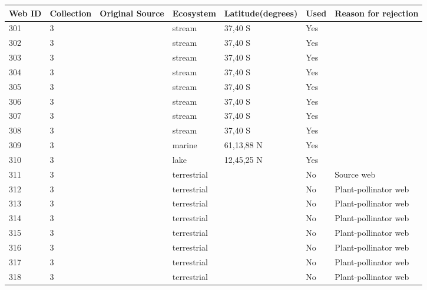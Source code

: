 \documentclass[12pt]{article}
\begin{document}
\begin{landscape}
    \begin{table}[h!]
    \centering
    {\footnotesize
      \begin{tabular}{p{2.8cm}p{1.3cm}p{3cm}p{2.2cm}p{2.5cm}lp{8.2cm}}
        \hline
        Web ID & Collection & Original Source & Ecosystem & Latitude(degrees) & Used  & Reason for rejection  \\
        \hline
        301   & 3 & \cite{Closs1994}  & stream & 37,40 S & Yes   &       \\
        302   & 3 & \cite{Closs1994}  & stream & 37,40 S & Yes   &       \\
        303   & 3 & \cite{Closs1994}  & stream & 37,40 S & Yes   &       \\
        304   & 3 & \cite{Closs1994}  & stream & 37,40 S & Yes   &       \\
        305   & 3 & \cite{Closs1994}  & stream & 37,40 S & Yes   &       \\
        306   & 3 & \cite{Closs1994}  & stream & 37,40 S & Yes   &       \\
        307   & 3 & \cite{Closs1994}  & stream & 37,40 S & Yes   &       \\
        308   & 3 & \cite{Closs1994}  & stream & 37,40 S & Yes   &       \\
        309   & 3 & \cite{Gontikaki2011}  & marine & 61,13,88 N & Yes   &       \\
        310   & 3 & \cite{Khan2009}  & lake  & 12,45,25 N & Yes   &       \\
        311   & 3 & \cite{Memmott2000}     & terrestrial &       & No    & Source web \\
        312   & 3 & \cite{Kaiser-Bunbury2009}  & terrestrial &       & No    & Plant-pollinator web \\
        313   & 3 & \cite{Kaiser-Bunbury2009}  & terrestrial &       & No    & Plant-pollinator web \\
        314   & 3 & \cite{Kaiser-Bunbury2011}  & terrestrial &       & No    & Plant-pollinator web \\
        315   & 3 & \cite{Kaiser-Bunbury2011}  & terrestrial &       & No    & Plant-pollinator web \\
        316   & 3 & \cite{Kaiser-Bunbury2011}  & terrestrial &       & No    & Plant-pollinator web \\
        317   & 3 & \cite{Kaiser-Bunbury2011}  & terrestrial &       & No    & Plant-pollinator web \\
        318   & 3 & \cite{Kaiser-Bunbury2011}  & terrestrial &       & No    & Plant-pollinator web \\

\end{tabular}}
\end{table}
\end{landscape}
\end{document}
